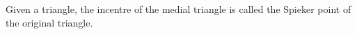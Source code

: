 Given a triangle, the incentre of the medial triangle is called the Spieker
point of the original triangle.